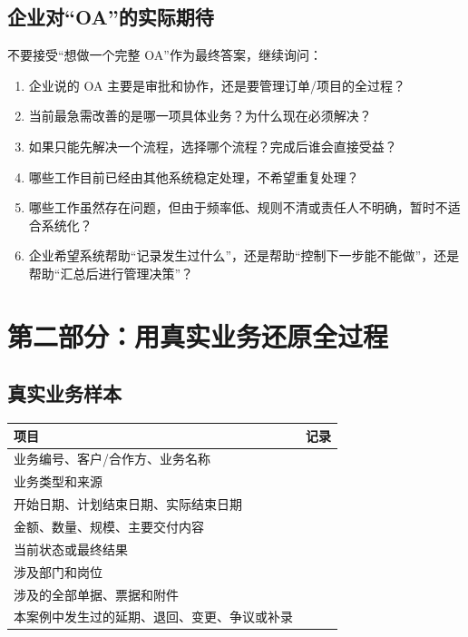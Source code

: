\documentclass[UTF8,a4paper,11pt]{ctexart}
\begin{document}
\subsection{企业对“OA”的实际期待}
不要接受“想做一个完整 OA”作为最终答案，继续询问：
\begin{enumerate}
  \item 企业说的 OA 主要是审批和协作，还是要管理订单/项目的全过程？
  \item 当前最急需改善的是哪一项具体业务？为什么现在必须解决？
  \item 如果只能先解决一个流程，选择哪个流程？完成后谁会直接受益？
  \item 哪些工作目前已经由其他系统稳定处理，不希望重复处理？
  \item 哪些工作虽然存在问题，但由于频率低、规则不清或责任人不明确，暂时不适合系统化？
  \item 企业希望系统帮助“记录发生过什么”，还是帮助“控制下一步能不能做”，还是帮助“汇总后进行管理决策”？
\end{enumerate}

\section{第二部分：用真实业务还原全过程}
\subsection{真实业务样本}
\begin{longtable}{p{}p{}}
\toprule
项目 & 记录 \\
\midrule
业务编号、客户/合作方、业务名称 & \\
业务类型和来源 & \\
开始日期、计划结束日期、实际结束日期 & \\
金额、数量、规模、主要交付内容 & \\
当前状态或最终结果 & \\
涉及部门和岗位 & \\
涉及的全部单据、票据和附件 & \\
本案例中发生过的延期、退回、变更、争议或补录 & \\
\bottomrule
\end{longtable}
\end{document}
